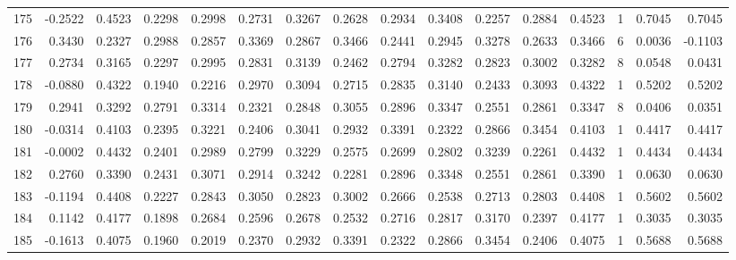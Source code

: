 \begin{tabular}{lrrrrrrrrrrrrrrr}
175 &     -0.2522 &  0.4523 &  0.2298 &  0.2998 &  0.2731 &  0.3267 &  0.2628 &  0.2934 &  0.3408 &  0.2257 &   0.2884 &     0.4523 &      1 &                    0.7045 &                     0.7045 \\
176 &      0.3430 &  0.2327 &  0.2988 &  0.2857 &  0.3369 &  0.2867 &  0.3466 &  0.2441 &  0.2945 &  0.3278 &   0.2633 &     0.3466 &      6 &                    0.0036 &                    -0.1103 \\
177 &      0.2734 &  0.3165 &  0.2297 &  0.2995 &  0.2831 &  0.3139 &  0.2462 &  0.2794 &  0.3282 &  0.2823 &   0.3002 &     0.3282 &      8 &                    0.0548 &                     0.0431 \\
178 &     -0.0880 &  0.4322 &  0.1940 &  0.2216 &  0.2970 &  0.3094 &  0.2715 &  0.2835 &  0.3140 &  0.2433 &   0.3093 &     0.4322 &      1 &                    0.5202 &                     0.5202 \\
179 &      0.2941 &  0.3292 &  0.2791 &  0.3314 &  0.2321 &  0.2848 &  0.3055 &  0.2896 &  0.3347 &  0.2551 &   0.2861 &     0.3347 &      8 &                    0.0406 &                     0.0351 \\
180 &     -0.0314 &  0.4103 &  0.2395 &  0.3221 &  0.2406 &  0.3041 &  0.2932 &  0.3391 &  0.2322 &  0.2866 &   0.3454 &     0.4103 &      1 &                    0.4417 &                     0.4417 \\
181 &     -0.0002 &  0.4432 &  0.2401 &  0.2989 &  0.2799 &  0.3229 &  0.2575 &  0.2699 &  0.2802 &  0.3239 &   0.2261 &     0.4432 &      1 &                    0.4434 &                     0.4434 \\
182 &      0.2760 &  0.3390 &  0.2431 &  0.3071 &  0.2914 &  0.3242 &  0.2281 &  0.2896 &  0.3348 &  0.2551 &   0.2861 &     0.3390 &      1 &                    0.0630 &                     0.0630 \\
183 &     -0.1194 &  0.4408 &  0.2227 &  0.2843 &  0.3050 &  0.2823 &  0.3002 &  0.2666 &  0.2538 &  0.2713 &   0.2803 &     0.4408 &      1 &                    0.5602 &                     0.5602 \\
184 &      0.1142 &  0.4177 &  0.1898 &  0.2684 &  0.2596 &  0.2678 &  0.2532 &  0.2716 &  0.2817 &  0.3170 &   0.2397 &     0.4177 &      1 &                    0.3035 &                     0.3035 \\
185 &     -0.1613 &  0.4075 &  0.1960 &  0.2019 &  0.2370 &  0.2932 &  0.3391 &  0.2322 &  0.2866 &  0.3454 &   0.2406 &     0.4075 &      1 &                    0.5688 &                     0.5688 \\

\end{tabular}

